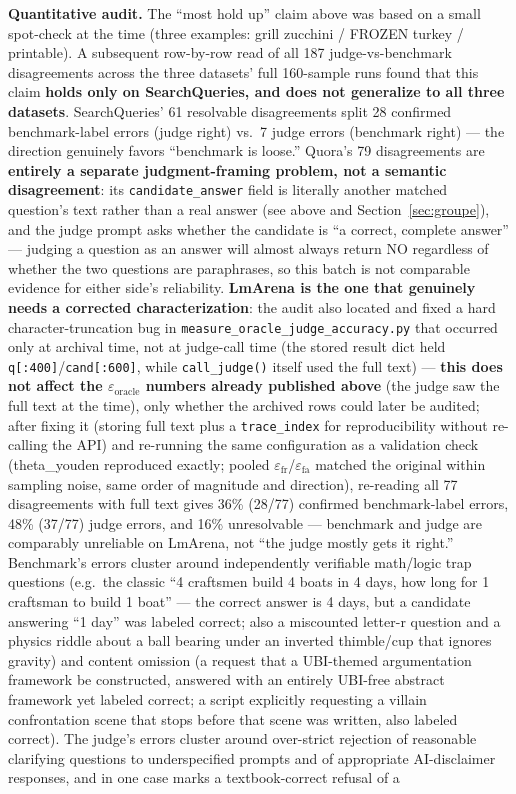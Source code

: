 \documentclass[11pt]{article}
\begin{document}
\textbf{Quantitative audit.} The ``most hold up'' claim above was based on a small spot-check at the time (three examples: grill zucchini / FROZEN turkey / printable). A subsequent row-by-row read of all 187 judge-vs-benchmark disagreements across the three datasets' full 160-sample runs found that this claim \textbf{holds only on SearchQueries, and does not generalize to all three datasets}. SearchQueries' 61 resolvable disagreements split 28 confirmed benchmark-label errors (judge right) vs.\ 7 judge errors (benchmark right) --- the direction genuinely favors ``benchmark is loose.'' Quora's 79 disagreements are \textbf{entirely a separate judgment-framing problem, not a semantic disagreement}: its \texttt{candidate\_\allowbreak{}answer} field is literally another matched question's text rather than a real answer (see above and Section~\ref{sec:groupe}), and the judge prompt asks whether the candidate is ``a correct, complete answer'' --- judging a question as an answer will almost always return NO regardless of whether the two questions are paraphrases, so this batch is not comparable evidence for either side's reliability. \textbf{LmArena is the one that genuinely needs a corrected characterization}: the audit also located and fixed a hard character-truncation bug in \texttt{measure\_\allowbreak{}oracle\_\allowbreak{}judge\_\allowbreak{}accuracy.\allowbreak{}py} that occurred only at archival time, not at judge-call time (the stored result dict held \texttt{q[:\allowbreak{}400]}/\texttt{cand[:\allowbreak{}600]}, while \texttt{call\_\allowbreak{}judge()} itself used the full text) --- \textbf{this does not affect the $\varepsilon_\text{oracle}$ numbers already published above} (the judge saw the full text at the time), only whether the archived rows could later be audited; after fixing it (storing full text plus a \texttt{trace\_\allowbreak{}index} for reproducibility without re-calling the API) and re-running the same configuration as a validation check (theta\_youden reproduced exactly; pooled $\varepsilon_\text{fr}$/$\varepsilon_\text{fa}$ matched the original within sampling noise, same order of magnitude and direction), re-reading all 77 disagreements with full text gives 36\% (28/77) confirmed benchmark-label errors, 48\% (37/77) judge errors, and 16\% unresolvable --- benchmark and judge are comparably unreliable on LmArena, not ``the judge mostly gets it right.'' Benchmark's errors cluster around independently verifiable math/logic trap questions (e.g.\ the classic ``4 craftsmen build 4 boats in 4 days, how long for 1 craftsman to build 1 boat'' --- the correct answer is 4 days, but a candidate answering ``1 day'' was labeled correct; also a miscounted letter-r question and a physics riddle about a ball bearing under an inverted thimble/cup that ignores gravity) and content omission (a request that a UBI-themed argumentation framework be constructed, answered with an entirely UBI-free abstract framework yet labeled correct; a script explicitly requesting a villain confrontation scene that stops before that scene was written, also labeled correct). The judge's errors cluster around over-strict rejection of reasonable clarifying questions to underspecified prompts and of appropriate AI-disclaimer responses, and in one case marks a textbook-correct refusal of a 
\end{document}
